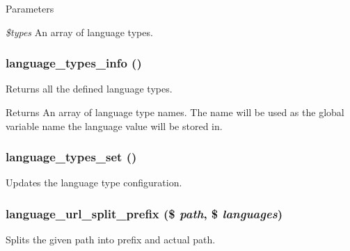 \begin{DoxyParams}{Parameters}
\item[{\em \$types}]An array of language types. \end{DoxyParams}
\hypertarget{group__language__negotiation_gadf6422ee7cb14204e01311f85a8c8b18}{
\subsubsection[{language\_\-types\_\-info}]{\setlength{\rightskip}{0pt plus 5cm}language\_\-types\_\-info ()}}
\label{group__language__negotiation_gadf6422ee7cb14204e01311f85a8c8b18}
Returns all the defined language types.

\begin{DoxyReturn}{Returns}
An array of language type names. The name will be used as the global variable name the language value will be stored in. 
\end{DoxyReturn}
\hypertarget{group__language__negotiation_ga6f6a0814332d6232293b84b38de5d4d0}{
\subsubsection[{language\_\-types\_\-set}]{\setlength{\rightskip}{0pt plus 5cm}language\_\-types\_\-set ()}}
\label{group__language__negotiation_ga6f6a0814332d6232293b84b38de5d4d0}
Updates the language type configuration. \hypertarget{group__language__negotiation_gab8ad64d53e83cae459c25341e564968d}{
\subsubsection[{language\_\-url\_\-split\_\-prefix}]{\setlength{\rightskip}{0pt plus 5cm}language\_\-url\_\-split\_\-prefix (\$ {\em path}, \/  \$ {\em languages})}}
\label{group__language__negotiation_gab8ad64d53e83cae459c25341e564968d}
Splits the given path into prefix and actual path.

